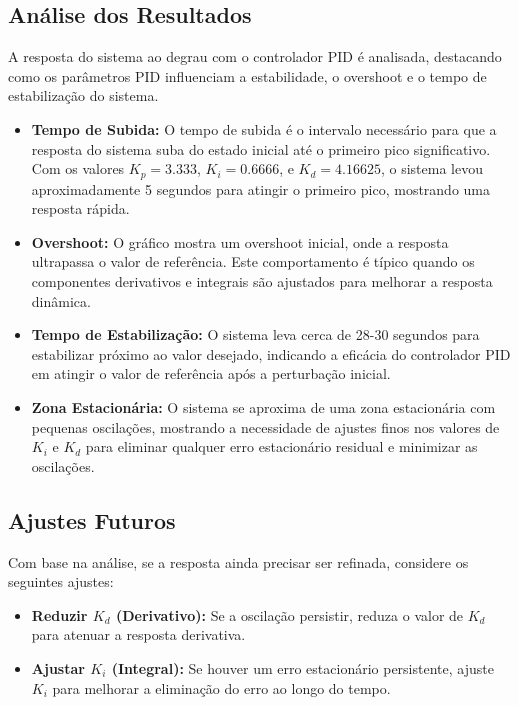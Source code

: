 \subsection{Análise dos Resultados}
A resposta do sistema ao degrau com o controlador PID é analisada, destacando como os parâmetros PID influenciam a estabilidade, o overshoot e o tempo de estabilização do sistema.

\begin{itemize}
    \item \textbf{Tempo de Subida:} O tempo de subida é o intervalo necessário para que a resposta do sistema suba do estado inicial até o primeiro pico significativo. Com os valores \( K_p = 3.333 \), \( K_i = 0.6666 \), e \( K_d = 4.16625 \), o sistema levou aproximadamente 5 segundos para atingir o primeiro pico, mostrando uma resposta rápida.

    \item \textbf{Overshoot:} O gráfico mostra um overshoot inicial, onde a resposta ultrapassa o valor de referência. Este comportamento é típico quando os componentes derivativos e integrais são ajustados para melhorar a resposta dinâmica.

    \item \textbf{Tempo de Estabilização:} O sistema leva cerca de 28-30 segundos para estabilizar próximo ao valor desejado, indicando a eficácia do controlador PID em atingir o valor de referência após a perturbação inicial.

    \item \textbf{Zona Estacionária:} O sistema se aproxima de uma zona estacionária com pequenas oscilações, mostrando a necessidade de ajustes finos nos valores de \( K_i \) e \( K_d \) para eliminar qualquer erro estacionário residual e minimizar as oscilações.
\end{itemize}

\subsection{Ajustes Futuros}
Com base na análise, se a resposta ainda precisar ser refinada, considere os seguintes ajustes:

\begin{itemize}
    \item \textbf{Reduzir \( K_d \) (Derivativo):} Se a oscilação persistir, reduza o valor de \( K_d \) para atenuar a resposta derivativa.
    \item \textbf{Ajustar \( K_i \) (Integral):} Se houver um erro estacionário persistente, ajuste \( K_i \) para melhorar a eliminação do erro ao longo do tempo.
\end{itemize}


